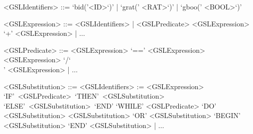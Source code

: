 \documentclass[a4paper,openany]{book}
\newcommand{\BS}{\char`\\}
\begin{document}
\begin{grammar}
<GSLIdentifiers> ::= `bid('<ID>`)' | `grat(' <RAT>`)' | `gboo(' <BOOL>`)' 

<GSLExpression> ::= <GSLIdentifiers> | <GSLPredicate> 
\alt <GSLExpression> `+' <GSLExpression> | $\ldots$

<GSLPredicate> ::= <GSLExpression>  `==' <GSLExpression> 
\alt <GSLExpression>  `/\BS'  <GSLExpression>  | $\ldots$

<GSLSubstitution> ::= %
<GSLIdentifiers> := <GSLExpression> 
\alt `IF'~<GSLPredicate>~`THEN'~<GSLSubstitution>~\\`ELSE'~<GSLSubstitution>~`END'
\alt `WHILE' <GSLPredicate> `DO' <GSLSubstitution>
\alt <GSLSubstitution> `OR' <GSLSubstitution> 
\alt `BEGIN' <GSLSubstitution> `END' <GSLSubstitution> | $\ldots$
\end{grammar}
\end{document}
